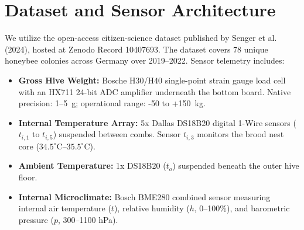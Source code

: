 \documentclass[10pt,twocolumn]{article}
\begin{document}
\section{Dataset and Sensor Architecture}
We utilize the open-access citizen-science dataset published by Senger et al. (2024), hosted at Zenodo Record 10407693.
The dataset covers 78 unique honeybee colonies across Germany over 2019--2022. Sensor telemetry includes:
\begin{itemize}
    \item \textbf{Gross Hive Weight:} Bosche H30/H40 single-point strain gauge load cell with an HX711 24-bit ADC amplifier underneath the bottom board. Native precision: 1--5~g; operational range: -50 to +150~kg.
    \item \textbf{Internal Temperature Array:} 5x Dallas DS18B20 digital 1-Wire sensors ($t_{i,1}$ to $t_{i,5}$) suspended between combs. Sensor $t_{i,3}$ monitors the brood nest core ($34.5^\circ\text{C}$--$35.5^\circ\text{C}$).
    \item \textbf{Ambient Temperature:} 1x DS18B20 ($t_o$) suspended beneath the outer hive floor.
    \item \textbf{Internal Microclimate:} Bosch BME280 combined sensor measuring internal air temperature ($t$), relative humidity ($h$, 0--100\%), and barometric pressure ($p$, 300--1100 hPa).
\end{itemize}
\end{document}
